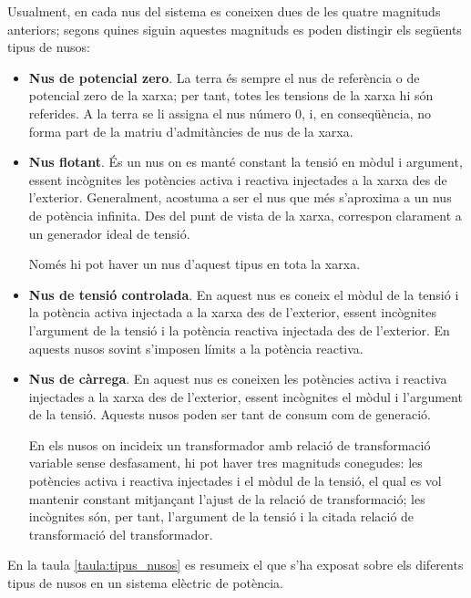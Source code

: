 Usualment, en cada nus del sistema es coneixen dues de les quatre
magnituds anteriors; segons quines siguin aquestes magnituds es
poden distingir els següents tipus de nusos:
\begin{itemize}
    \item \textbf{Nus de potencial zero}. La terra és sempre el nus de referència o de potencial zero de la
    xarxa; per tant, totes les tensions de la xarxa hi són referides.
    A la terra se li assigna el   nus número 0, i, en conseqüència, no forma part de la matriu d'admitàncies de nus de la xarxa.

   \item \textbf{Nus flotant}. És un nus on es manté constant la tensió en mòdul i argument,
   essent incògnites les potències activa i reactiva injectades a la xarxa des de l'exterior.
    Generalment, acostuma a ser el nus que més s'aproxima a un nus de potència infinita. Des del
    punt de vista de la xarxa, correspon clarament a un generador ideal de tensió.

Només hi pot haver un nus d'aquest tipus en tota la xarxa.
   \item \textbf{Nus de tensió controlada}. En aquest nus es coneix el mòdul de la tensió i la
   potència activa injectada a la xarxa des de l'exterior, essent incògnites l'argument de la tensió i la potència
   reactiva injectada des de l'exterior. En aquests nusos sovint s'imposen límits a la potència reactiva.

   \item \textbf{Nus de càrrega}. En aquest nus es coneixen les potències activa i reactiva
   injectades a la xarxa des de l'exterior, essent incògnites el mòdul i l'argument de la tensió.
   Aquests nusos poden ser tant de consum com de generació.

En els nusos on incideix un transformador amb relació de
transformació variable sense desfasament, hi pot haver tres magnituds
conegudes: les potències activa i reactiva injectades i el mòdul de
la tensió, el qual es vol mantenir constant mitjançant l'ajust de la
relació de transformació; les incògnites són, per tant, l'argument de
la tensió i la citada relació de transformació del transformador.
\end{itemize}

En la taula \vref{taula:tipus_nusos} es resumeix el que s'ha exposat
sobre els diferents tipus de nusos en un sistema elèctric de
potència.

